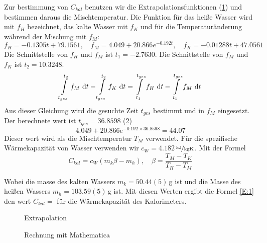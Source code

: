 \documentclass[11pt,a4paper]{article}
\begin{document}
Zur bestimmung von $C_{kal}$ benutzen wir die Extrapolationsfunktionen (\ref{Bild:2}) und bestimmen daraus die Mischtemperatur. Die Funktion für das heiße Wasser wird mit $f_H$ bezeichnet, das kalte Wasser mit $f_K$ und für die Temperaturänderung während der Mischung mit $f_M$: 
$$f_H = -0.1305 t + 79.1561, \quad f_M = 4.049 + 20.866e^{-0.192t}, \quad f_K = -0.01288 t + 47.0561$$
Die Schnittstelle von $f_H$ und $f_M$ ist $t_1 = -2.7630$. Die Schnittstelle von $f_M$ und $f_K$ ist $t_2 = 10.3248$.
$$\int\displaylimits_{t_{ges}}^{t_2} f_M\ \mathrm{d}t - \int\displaylimits_{t_{ges}}^{t_2} f_K\ \mathrm{d}t = \int\displaylimits_{t_1}^{t_{ges}} f_H\ \mathrm{d}t - \int\displaylimits_{t_1}^{t_{ges}} f_M\ \mathrm{d}t$$ 
Aus dieser Gleichung wird die gesuchte Zeit $t_{ges}$ bestimmt und in $f_M$ eingesetzt. Der berechnete wert ist $t_{ges} = 36.8598$ (\ref{Bild:3}) 
$$4.049 + 20.866e^{-0.192\times 36.8598} = 44.07$$
Dieser wert wird als die Mischtemperatur $T_M$ verwendet. Für die spezifische Wärmekapazität von Wasser verwenden wir $c_W = 4.182$\,$\nicefrac{\mathrm{kJ}}{\textrm{kgK}}$. Mit der Formel 
\begin{equation}\label{E:1}
  C_{kal} = c_W(m_k\beta - m_h), \quad \beta = \frac{T_M - T_K}{T_H - T_M}
\end{equation}

Wobei die masse des kalten Wassers $m_k = 50.44(5)$\,g ist und die Masse des heißen Wassers $m_h = 103.59(5)$\,g ist.
Mit diesen Werten ergibt die Formel \ref{E:1} den wert $C_{kal} = $ für die Wärmekapazität des Kalorimeters.




\begin{figure}[h]
	\centering
  	\renewcommand\thefigure{B2}
	\caption{Extrapolation}
	\label{Bild:2}
\end{figure}

\begin{figure}[p]
	\centering
  	\renewcommand\thefigure{B3}
	\caption{Rechnung mit Mathematica}
	\label{Bild:3}
\end{figure}
\end{document}
